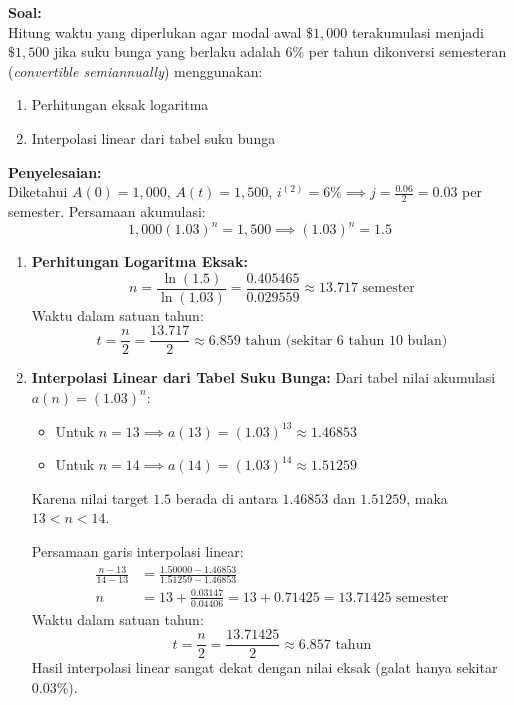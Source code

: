 \documentclass[11pt,a4paper]{article}
\begin{document}
\begin{examplebox}
\textbf{Soal:}\\
Hitung waktu yang diperlukan agar modal awal $\$1{,}000$ terakumulasi menjadi $\$1{,}500$ jika suku bunga yang berlaku adalah $6\%$ per tahun dikonversi semesteran (\textit{convertible semiannually}) menggunakan:
\begin{enumerate}[label=(\alph*)]
    \item Perhitungan eksak logaritma
    \item Interpolasi linear dari tabel suku bunga
\end{enumerate}

\vspace{0.5em}
\textbf{Penyelesaian:}\\
Diketahui $A(0) = 1{,}000$, $A(t) = 1{,}500$, $i^{(2)} = 6\% \implies j = \frac{0.06}{2} = 0.03$ per semester.
Persamaan akumulasi:
\begin{equation*}
    1{,}000 (1.03)^n = 1{,}500 \implies (1.03)^n = 1.5
\end{equation*}

\begin{enumerate}[label=(\alph*)]
    \item \textbf{Perhitungan Logaritma Eksak:}
    \begin{equation*}
        n = \frac{\ln(1.5)}{\ln(1.03)} = \frac{0.405465}{0.029559} \approx 13.717 \text{ semester}
    \end{equation*}
    Waktu dalam satuan tahun:
    \begin{equation*}
        t = \frac{n}{2} = \frac{13.717}{2} \approx 6.859 \text{ tahun (sekitar 6 tahun 10 bulan)}
    \end{equation*}
    
    \item \textbf{Interpolasi Linear dari Tabel Suku Bunga:}
    Dari tabel nilai akumulasi $a(n) = (1.03)^n$:
    \begin{itemize}
        \item Untuk $n = 13 \implies a(13) = (1.03)^{13} \approx 1.46853$
        \item Untuk $n = 14 \implies a(14) = (1.03)^{14} \approx 1.51259$
    \end{itemize}
    Karena nilai target $1.5$ berada di antara $1.46853$ dan $1.51259$, maka $13 < n < 14$.
    
    Persamaan garis interpolasi linear:
    \begin{align*}
        \frac{n - 13}{14 - 13} &= \frac{1.50000 - 1.46853}{1.51259 - 1.46853} \\[0.4em]
        n &= 13 + \frac{0.03147}{0.04406} = 13 + 0.71425 = 13.71425 \text{ semester}
    \end{align*}
    Waktu dalam satuan tahun:
    \begin{equation*}
        t = \frac{n}{2} = \frac{13.71425}{2} \approx 6.857 \text{ tahun}
    \end{equation*}
    Hasil interpolasi linear sangat dekat dengan nilai eksak (galat hanya sekitar 0.03\%).
\end{enumerate}
\end{examplebox}
\end{document}
